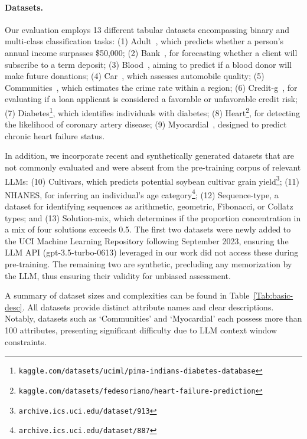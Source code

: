\paragraph{Datasets.}
Our evaluation employs 13 different tabular datasets encompassing binary and multi-class classification tasks: (1) Adult~\cite{asuncion2007uci}, which predicts whether a person’s annual income surpasses \$50,000; (2) Bank~\cite{moro2014data}, for forecasting whether a client will subscribe to a term deposit; (3) Blood~\cite{yeh2009knowledge}, aiming to predict if a blood donor will make future donations; (4) Car~\cite{kadra2021well}, which assesses automobile quality; (5) Communities~\cite{misc_communities_and_crime_183}, which estimates the crime rate within a region; (6) Credit-g~\cite{kadra2021well}, for evaluating if a loan applicant is considered a favorable or unfavorable credit risk; (7) Diabetes\footnote{\texttt{kaggle.com/datasets/uciml/pima-indians-diabetes-database}}, which identifies individuals with diabetes; (8) Heart\footnote{\texttt{kaggle.com/datasets/fedesoriano/heart-failure-prediction}}, for detecting the likelihood of coronary artery disease; (9) Myocardial~\cite{misc_myocardial_infarction_complications_579}, designed to predict chronic heart failure status.

In addition, we incorporate recent and synthetically generated datasets that are not commonly evaluated and were absent from the pre-training corpus of relevant LLMs: (10) Cultivars, which predicts potential soybean cultivar grain yield\footnote{\texttt{archive.ics.uci.edu/dataset/913}}; (11) NHANES, for inferring an individual’s age category\footnote{\texttt{archive.ics.uci.edu/dataset/887}}; (12) Sequence-type, a dataset for identifying sequences as arithmetic, geometric, Fibonacci, or Collatz types; and (13) Solution-mix, which determines if the proportion concentration in a mix of four solutions exceeds 0.5. The first two datasets were newly added to the UCI Machine Learning Repository following September 2023, ensuring the LLM API (gpt-3.5-turbo-0613) leveraged in our work did not access these during pre-training. The remaining two are synthetic, precluding any memorization by the LLM, thus ensuring their validity for unbiased assessment.

A summary of dataset sizes and complexities can be found in Table~\ref{Tab:basic-desc}. All datasets provide distinct attribute names and clear descriptions. Notably, datasets such as `Communities' and `Myocardial' each possess more than 100 attributes, presenting significant difficulty due to LLM context window constraints.

